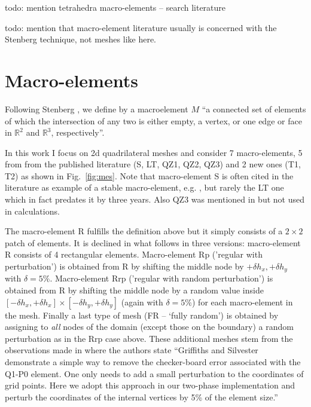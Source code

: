 \documentclass[a4paper,12pt]{article}
\begin{document}
{\color{red} todo: mention tetrahedra macro-elements -- search literature}

{\color{red} todo: mention that macro-element literature usually is concerned with 
the Stenberg technique, not meshes like here.}

\section{Macro-elements}\label{sec3}

Following Stenberg \cite{sten90}, we define by a macroelement $M$ ``a connected set of elements of which the 
intersection of any two is either empty, a vertex, or one edge or face in $\mathbb{R}^2$ 
and $\mathbb{R}^3$, respectively''.

In this work I focus on 2d quadrilateral meshes and consider 7 
macro-elements, 5 from from the published literature (S, LT, QZ1, QZ2, QZ3) and 2 new ones (T1, T2) as
shown in Fig.~\ref{fig:mes}.
Note that macro-element S is often cited in the literature as example of a stable macro-element, 
e.g. \cite{chba93,elsw}, but rarely the LT one which in fact predates it by three years. 
Also QZ3 was mentioned in \cite{idsn95} but not used in calculations. 

The macro-element R fulfills the definition above but 
it simply consists of a $2\times 2$ patch of elements. It is declined in what follows in three
versions: macro-element R consists of 4 rectangular elements. 
Macro-element Rp ('regular with perturbation') is obtained from R by shifting the 
middle node by $+\delta h_x,+\delta h_y$
with $\delta =5\%$. Macro-element Rrp ('regular with random perturbation') 
is obtained from R by shifting the middle node
by a random value inside $[-\delta h_x,+\delta h_x]\times[-\delta h_y,+\delta h_y]$ (again with $\delta =5\%$) 
for each macro-element in the mesh.
Finally a last type of mesh (FR -- `fully random') is obtained by assigning 
to {\it all} nodes of the domain (except those on the boundary) a random perturbation as in the Rrp case above. 
These additional meshes stem from the observations made in \cite{lumh24} where the 
authors state 
``Griffiths and Silvester \cite{grsi94} demonstrate a simple way to remove the checker-board error associated with
the Q1-P0 element. One only needs to add a small perturbation to the coordinates of grid points. Here we adopt
this approach in our two-phase implementation and perturb the coordinates of the internal vertices by 5\% of the
element size.''
\end{document}
